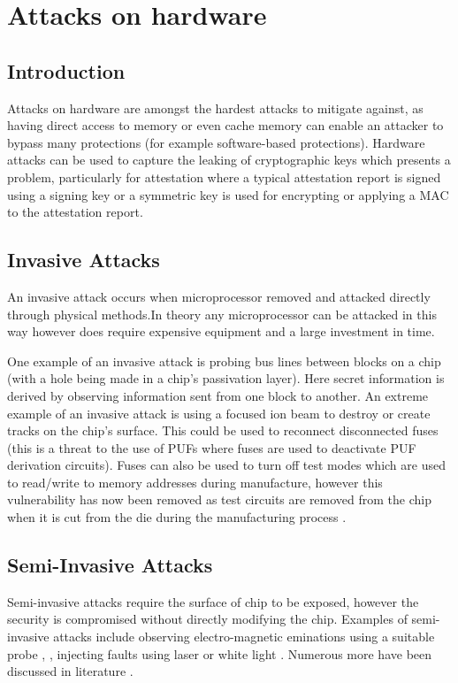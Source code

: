 \section{Attacks on hardware}
\subsection{Introduction}

Attacks on hardware are amongst the hardest attacks to mitigate against, as having direct access to memory or even cache memory can enable an attacker to bypass many protections (for example software-based protections). Hardware attacks can be used to capture the leaking of cryptographic keys which presents a problem, particularly for attestation where a typical attestation report is signed using a signing key or a symmetric key is used for encrypting or applying a MAC to the attestation report.

\subsection{Invasive Attacks}
An invasive attack occurs when microprocessor removed and attacked directly through physical methods.In theory any microprocessor can be attacked in this way however does require expensive equipment and a large investment in time.

One example of an invasive attack is probing bus lines between blocks on a chip (with a hole being made in a chip's passivation layer). Here secret information is derived by observing information sent from one block to another. An extreme example of an invasive attack is using a focused ion beam to destroy or create tracks on the chip's surface. This could be used to reconnect disconnected fuses (this is a threat to the use of PUFs  where fuses are used to deactivate PUF derivation circuits). Fuses can also be used to turn off test modes which are used to read/write to memory addresses during manufacture, however this vulnerability has now been removed as test circuits are  removed from the chip when it is cut from the die during the manufacturing process \cite{Anderson1996} \cite{Kommerling1999}.

\subsection{Semi-Invasive Attacks}

Semi-invasive attacks require the surface of chip to be exposed, however the security is compromised without directly modifying the chip. Examples of semi-invasive attacks include observing electro-magnetic eminations using a suitable probe \cite{Gandolfi2007}, \cite{Quisquater2001}, injecting faults using laser \cite{Bar-el2006} or white light \cite{Skorobogatov2007}. Numerous more have been discussed in literature \cite{Skorobogatov2005}.

